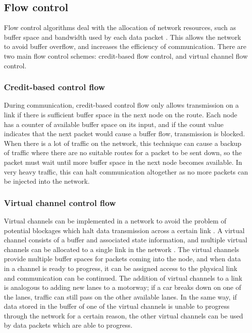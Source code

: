 \documentclass[a4paper, 12pt]{article}
\begin{document}
\subsection{Flow control}

Flow control algorithms deal with the allocation of network resources, such as buffer space and bandwidth used by each data packet \cite{Jon97}. This allows the network to avoid buffer overflow, and increases the efficiency of communication. There are two main flow control schemes: credit-based flow control, and virtual channel flow control.

\subsubsection{Credit-based control flow}

During communication, credit-based control flow only allows transmission on a link if there is sufficient buffer space in the next node on the route. Each node has a counter of available buffer space on its input, and if the count value indicates that the next packet would cause a buffer flow, transmission is blocked. When there is a lot of traffic on the network, this technique can cause a backup of traffic where there are no suitable routes for a packet to be sent down, so the packet must wait until more buffer space in the next node becomes available. In very heavy traffic, this can halt communication altogether as no more packets can be injected into the network.

\subsubsection{Virtual channel control flow}

Virtual channels can be implemented in a network to avoid the problem of potential blockages which halt data transmission across a certain link \cite{Dal90}. A virtual channel consists of a buffer and associated state information, and multiple virtual channels can be allocated to a single link in the network \cite{Dal87}. The virtual channels provide multiple buffer spaces for packets coming into the node, and when data in a channel is ready to progress, it can be assigned access to the physical link and communication can be continued. The addition of virtual channels to a link is analogous to adding new lanes to a motorway; if a car breaks down on one of the lanes, traffic can still pass on the other available lanes. In the same way, if data stored in the buffer of one of the virtual channels is unable to progress through the network for a certain reason, the other virtual channels can be used by data packets which are able to progress.
\end{document}
